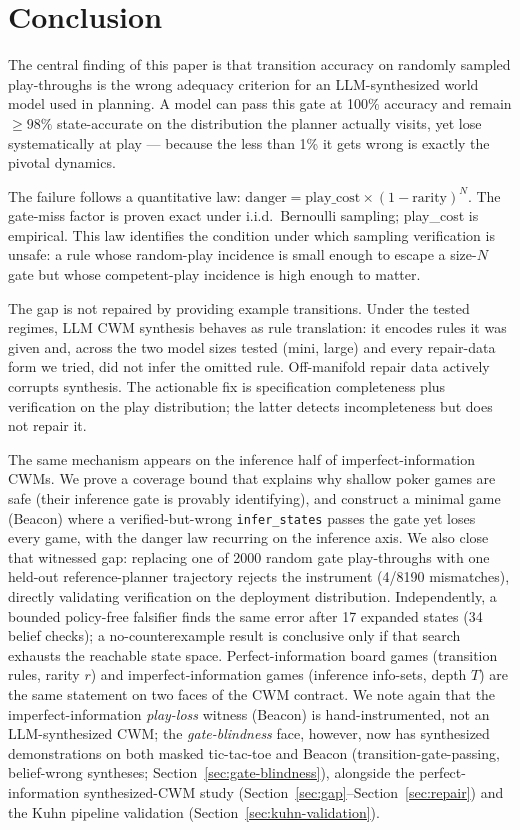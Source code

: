 \documentclass[11pt]{article}
\theoremstyle{remark}
\begin{document}
\section{Conclusion}

The central finding of this paper is that transition accuracy on randomly sampled play-throughs is the wrong adequacy criterion for an LLM-synthesized world model used in planning. A model can pass this gate at 100\% accuracy and remain $\geq 98\%$ state-accurate on the distribution the planner actually visits, yet lose systematically at play --- because the less than 1\% it gets wrong is exactly the pivotal dynamics.

The failure follows a quantitative law: $\mathrm{danger} = \mathrm{play\_cost} \times (1 - \mathrm{rarity})^N$. The gate-miss factor is proven exact under i.i.d.\ Bernoulli sampling; play\_cost is empirical. This law identifies the condition under which sampling verification is unsafe: a rule whose random-play incidence is small enough to escape a size-$N$ gate but whose competent-play incidence is high enough to matter.

The gap is not repaired by providing example transitions. Under the tested regimes, LLM CWM synthesis behaves as rule translation: it encodes rules it was given and, across the two model sizes tested (mini, large) and every repair-data form we tried, did not infer the omitted rule. Off-manifold repair data actively corrupts synthesis. The actionable fix is specification completeness plus verification on the play distribution; the latter detects incompleteness but does not repair it.

The same mechanism appears on the inference half of imperfect-information CWMs. We prove a coverage bound that explains why shallow poker games are safe (their inference gate is provably identifying), and construct a minimal game (Beacon) where a verified-but-wrong \texttt{infer\_states} passes the gate yet loses every game, with the danger law recurring on the inference axis. We also close that witnessed gap: replacing one of 2000 random gate play-throughs with one held-out reference-planner trajectory rejects the instrument (4/8190 mismatches), directly validating verification on the deployment distribution. Independently, a bounded policy-free falsifier finds the same error after 17 expanded states (34 belief checks); a no-counterexample result is conclusive only if that search exhausts the reachable state space. Perfect-information board games (transition rules, rarity $r$) and imperfect-information games (inference info-sets, depth $T$) are the same statement on two faces of the CWM contract. We note again that the imperfect-information \emph{play-loss} witness (Beacon) is hand-instrumented, not an LLM-synthesized CWM; the \emph{gate-blindness} face, however, now has synthesized demonstrations on both masked tic-tac-toe and Beacon (transition-gate-passing, belief-wrong syntheses; Section~\ref{sec:gate-blindness}), alongside the perfect-information synthesized-CWM study (Section~\ref{sec:gap}--Section~\ref{sec:repair}) and the Kuhn pipeline validation (Section~\ref{sec:kuhn-validation}).
\end{document}
